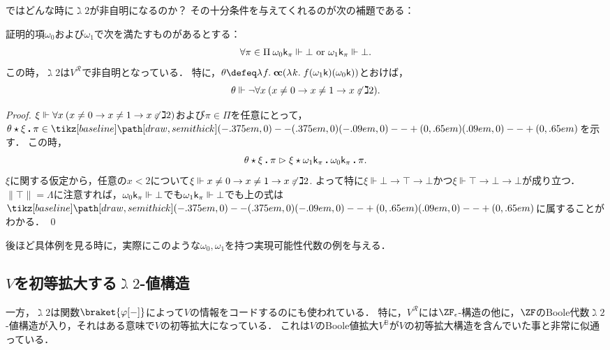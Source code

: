 \documentclass[realisability.tex]{subfiles}
\begin{document}
ではどんな時に$\gimel 2$が非自明になるのか？
その十分条件を与えてくれるのが次の補題である：

\begin{lemma}\label{lem:char-ba-nontriv}
 証明的項$\omega_0$および$\omega_1$で次を満たすものがあるとする：
 \[
  \forall \pi \in \Pi \: \omega_0 \mathsf{k}_\pi \Vdash \bot \text{ or } \omega_1 \mathsf{k}_\pi \Vdash \bot.
 \]
 この時，$\gimel 2$は$V^{\mathcal{R}}$で非自明となっている．
 特に，$\theta \defeq \abs{f}{\cc (\abs{k}{f(\omega_1 \conti)(\omega_0 \conti)})}$とおけば，
 \[
  \theta \Vdash \neg \forall x \: (x \neq 0 \to x \neq 1 \to x \not\mathrel{\varepsilon} \gimel 2).
 \]
\end{lemma}
\begin{proof}
 $\xi \Vdash \forall x \: (x \neq 0 \to x \neq 1 \to x \not\mathrel{\varepsilon} \gimel 2)$および$\pi \in \Pi$を任意にとって，$\theta \cons \xi \push \pi\in \pole$を示す．
 この時，
 \[
  {\theta \mathbin{\star} \xi \mathbin{\boldsymbol{.}} \pi}
  \mathrel{\rhd} {\xi \mathbin{\star} {\omega_1 \mathsf{k}_{\pi}} \mathbin{\boldsymbol{.}} {\omega_0 \mathsf{k}_{\pi}} \mathbin{\boldsymbol{.}} \pi}.
 \]
 $\xi$に関する仮定から，任意の$x < 2$について$\xi \Vdash x \neq 0 \to x \neq 1 \to x \not\mathrel{\varepsilon} \gimel 2$.
 よって特に$\xi \Vdash \bot \to \top \to \bot$かつ$\xi \Vdash \top \to \bot \to \bot$が成り立つ．
 $\|\top\| = \Lambda$に注意すれば，$\omega_0 \mathsf{k}_\pi \Vdash \bot$でも$\omega_1 \mathsf{k}_\pi \Vdash \bot$でも上の式は$\pole$に属することがわかる． \qed
\end{proof}
後ほど具体例を見る時に，実際にこのような$\omega_0, \omega_1$を持つ実現可能性代数の例を与える．

\subsection{$V$を初等拡大する$\gimel 2$-値構造}
一方，$\gimel 2$は関数$\braket{ \varphi[-] }$によって$V$の情報をコードするのにも使われている．
特に，$V^{\mathcal{R}}$には$\ZF_{\epsilon}$-構造の他に，$\ZF$のBoole代数$\gimel 2$-値構造が入り，それはある意味で$V$の初等拡大になっている．
これは$V$のBoole値拡大$V^{\mathbb{B}}$が$V$の初等拡大構造を含んでいた事と非常に似通っている．
\end{document}
